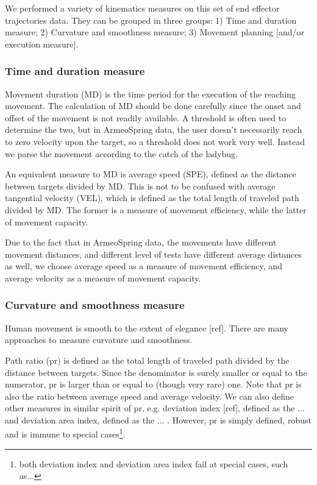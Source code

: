 We performed a variety of kinematics measures on this set of end effector trajectories data. They can be grouped in three groups: 1) Time and duration measure; 2) Curvature and smoothness measure; 3) Movement planning [and/or execution measure]. 

\subsubsection{Time and duration measure}
Movement duration (MD) is the time period for the execution of the reaching movement. The calculation of MD should be done carefully since the onset and offset of the movement is not readily available. A threshold is often used to determine the two, but in ArmeoSpring data, the user doesn't necessarily reach to zero velocity upon the target, so a threshold does not work very well. Instead we parse the movement according to the catch of the ladybug. 

An equivalent measure to MD is average speed (SPE), defined as the distance between targets divided by MD. This is not to be confused with average tangential velocity (VEL), which is defined as the total length of traveled path divided by MD. The former is a measure of movement efficiency, while the latter of movement capacity. 

Due to the fact that in ArmeoSpring data, the movements have different movement distances, and different level of tests have different average distances as well, we choose average speed as a measure of movement efficiency, and average velocity as a measure of movement capacity. 

\subsubsection{Curvature and smoothness measure}
Human movement is smooth to the extent of elegance [ref]. There are many approaches to measure curvature and smoothness.

Path ratio (pr) is defined as the total length of traveled path divided by the distance between targets. Since the denominator is surely smaller or equal to the numerator, pr is larger than or equal to (though very rare) one. Note that pr is also the ratio between average speed and average velocity. We can also define other measures in similar spirit of pr, e.g. deviation index [ref], defined as the ... and deviation area index, defined as the ... . However, pr is simply defined, robust and is immune to special cases\footnote{both deviation index and deviation area index fail at special cases, such as...}. 

